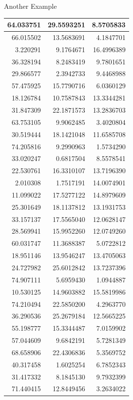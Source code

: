 \documentclass[
  ignorenonframetext,
]{beamer}
\begin{document}
\begin{frame}{Another Example}
\begin{table}
\begin{tabular}[t]{r|r|r}
\hline
64.033751 & 29.5593251 & 8.5705833\\
\hline
66.015502 & 13.5683691 & 4.1847701\\
\hline
3.220291 & 9.1764671 & 16.4996389\\
\hline
36.328194 & 8.2483419 & 9.7801651\\
\hline
29.866577 & 2.3942733 & 9.4468988\\
\hline
57.475925 & 15.7790716 & 6.0360129\\
\hline
18.126784 & 10.7587843 & 13.3344281\\
\hline
31.847309 & 22.1871573 & 13.2836703\\
\hline
63.753105 & 9.9062485 & 3.4020804\\
\hline
30.519444 & 18.1421048 & 11.6585708\\
\hline
74.205816 & 9.2990963 & 1.5734290\\
\hline
33.020247 & 0.6817504 & 8.5578541\\
\hline
22.530761 & 16.3310107 & 13.7196390\\
\hline
2.010308 & 1.7517191 & 14.0074901\\
\hline
11.099022 & 17.5277122 & 14.8979609\\
\hline
25.301649 & 18.1137812 & 13.1931753\\
\hline
33.157137 & 17.5565040 & 12.0628147\\
\hline
28.569941 & 15.9952260 & 12.0749260\\
\hline
60.031747 & 11.3688387 & 5.0722812\\
\hline
18.951146 & 13.9546247 & 13.4705063\\
\hline
24.727982 & 25.6012842 & 13.7237396\\
\hline
74.907111 & 5.6959430 & 1.0944887\\
\hline
10.530125 & 14.9603882 & 15.5819986\\
\hline
74.210494 & 22.5850200 & 4.2963770\\
\hline
36.290536 & 25.2679184 & 12.5665225\\
\hline
55.198777 & 15.3344487 & 7.0159902\\
\hline
57.044609 & 9.6842191 & 5.7281349\\
\hline
68.658906 & 22.4306836 & 5.3569752\\
\hline
40.317458 & 1.6025254 & 6.7852343\\
\hline
31.417332 & 8.1845130 & 9.7932399\\
\hline
71.440415 & 12.8449456 & 3.2634022\\

\end{tabular}
\end{table}
\end{frame}
\end{document}
